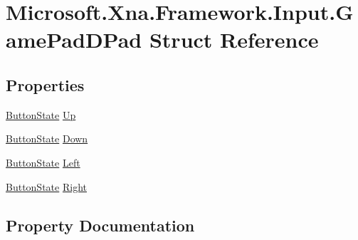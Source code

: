 \hypertarget{struct_microsoft_1_1_xna_1_1_framework_1_1_input_1_1_game_pad_d_pad}{}\section{Microsoft.\+Xna.\+Framework.\+Input.\+Game\+Pad\+D\+Pad Struct Reference}
\label{struct_microsoft_1_1_xna_1_1_framework_1_1_input_1_1_game_pad_d_pad}
\subsection*{Properties}
\begin{DoxyCompactItemize}
\item 
\hyperlink{namespace_microsoft_1_1_xna_1_1_framework_1_1_input_a1a87ac3c1443696fdac6f8cdd396b161}{Button\+State} \hyperlink{struct_microsoft_1_1_xna_1_1_framework_1_1_input_1_1_game_pad_d_pad_a8302936eec024021f510a2a633ca3a35}{Up}
\item 
\hyperlink{namespace_microsoft_1_1_xna_1_1_framework_1_1_input_a1a87ac3c1443696fdac6f8cdd396b161}{Button\+State} \hyperlink{struct_microsoft_1_1_xna_1_1_framework_1_1_input_1_1_game_pad_d_pad_a754b498cc2bfecce732a9f172347a35e}{Down}
\item 
\hyperlink{namespace_microsoft_1_1_xna_1_1_framework_1_1_input_a1a87ac3c1443696fdac6f8cdd396b161}{Button\+State} \hyperlink{struct_microsoft_1_1_xna_1_1_framework_1_1_input_1_1_game_pad_d_pad_a87c4d6321ae894e24c81a9b568ac96b9}{Left}
\item 
\hyperlink{namespace_microsoft_1_1_xna_1_1_framework_1_1_input_a1a87ac3c1443696fdac6f8cdd396b161}{Button\+State} \hyperlink{struct_microsoft_1_1_xna_1_1_framework_1_1_input_1_1_game_pad_d_pad_a6a70a9081781c9389e777f27bb121fbb}{Right}
\end{DoxyCompactItemize}


\subsection{Property Documentation}
\hypertarget{struct_microsoft_1_1_xna_1_1_framework_1_1_input_1_1_game_pad_d_pad_a754b498cc2bfecce732a9f172347a35e}{}
